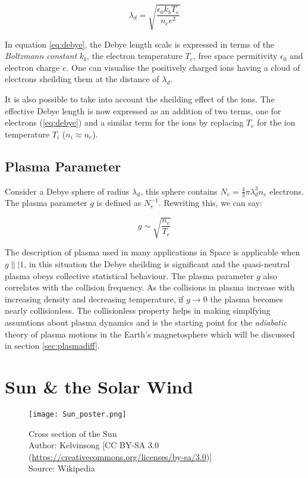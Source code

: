 \begin{equation}\label{eq:debye}
    \lambda_d = \sqrt{\frac{\epsilon_0 k_b T_e}{n_e e^2}}
\end{equation}

In equation \ref{eq:debye}, the Debye length scale is expressed in terms of the \emph{Boltzmann constant} $k_b$, 
the electron temperature $T_e$, free space permitivity $\epsilon_0$ and electron charge $e$. One can visualise the 
positively charged ions having a cloud of electrons sheilding them at the distance of $\lambda_d$. 

It is also possible to take into account the sheilding effect of the ions. The effective Debye length is now 
expressed as an addition of two terms, one for electrons (\ref{eq:debye}) and a similar term for the ions by replacing 
$T_e$ for the ion temperature $T_i$ ($n_i \approx n_e$). 

\subsection*{Plasma Parameter}

Consider a Debye sphere of radius $\lambda_d$, this sphere contains $N_e = \frac{4}{3}\pi \lambda^3_d n_e$ electrons. The plasma parameter $g$ is defined as $N_{e}^{-1}$. Rewriting this, we can say:

\begin{equation}
    g \sim \sqrt{\frac{n_e}{T_e}}
\end{equation}

The description of plasma used in many applications in Space is applicable when $g \|| 1$, in this situation 
the Debye sheilding is significant and the quasi-neutral plasma obeys collective statistical behaviour. 
The plasma parameter $g$ also correlates with the collision frequency. As the collisions in plasma increase 
with increasing density and decreasing temperature, if $g \longrightarrow 0$ the plasma becomes nearly collisionless. The collisionless property helps in making simplfying assumtions about plasma dynamics and is the starting point 
for the \emph{adiabatic} theory of plasma motions in the Earth's magnetosphere which will be discussed in section 
\ref{sec:plasmadiff}.


\section{Sun \& the Solar Wind}\label{sec:solar}

\begin{figure}
    \noindent\texttt{[image: Sun\_poster.png]}
    \caption{\small Cross section of the Sun \\ 
    Author: Kelvinsong [CC BY-SA 3.0 (\url{https://creativecommons.org/licenses/by-sa/3.0})] \\ 
    Source: Wikipedia}
    \label{fig:SunLayers}
\end{figure}


